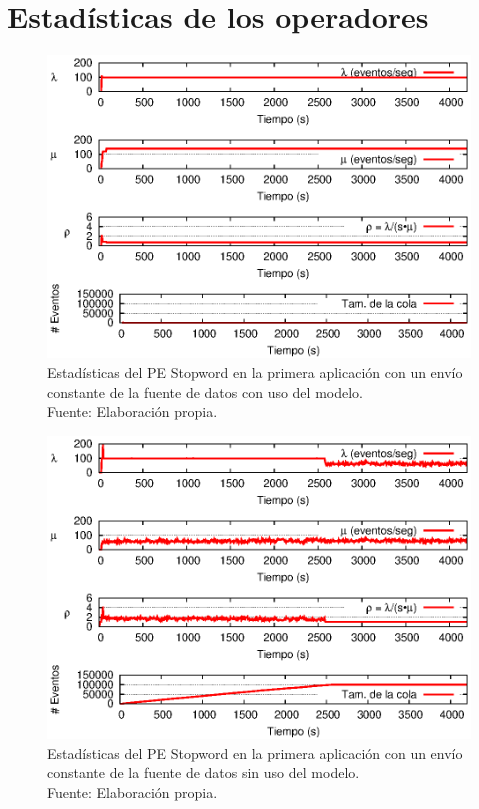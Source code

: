 \chapter{Estadísticas de los operadores}
\label{apendice:estadisticas-operadores}
\begin{figure}[!ht]
    \centering
    \captionsetup{justification=centering}
    \includegraphics[scale=0.9]{images/exp/app1/uniform/cm/statusStopwordPE.eps}
    \caption[Estadísticas del PE Stopword en la primera aplicación con un envío constante de la fuente de datos con uso del modelo.]{Estadísticas del PE Stopword en la primera aplicación con un envío constante de la fuente de datos con uso del modelo.\\Fuente: Elaboración propia.}
    \label{fig:app1-uniform-statusStopwordPE-cm}
\end{figure}

\begin{figure}[!ht]
    \centering
    \captionsetup{justification=centering}
    \includegraphics[scale=0.9]{images/exp/app1/uniform/sm/statusStopwordPE.eps}
    \caption[Estadísticas del PE Stopword en la primera aplicación con un envío constante de la fuente de datos sin uso del modelo.]{Estadísticas del PE Stopword en la primera aplicación con un envío constante de la fuente de datos sin uso del modelo.\\Fuente: Elaboración propia.}
    \label{fig:app1-uniform-statusStopwordPE-sm}
\end{figure}

